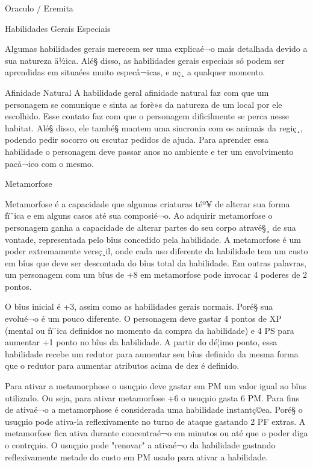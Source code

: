 


		 
	
	
  
  




 
 Oraculo / Eremita 
 	





Habilidades Gerais Especiais

Algumas habilidades gerais merecem ser uma explicaé¬o mais detalhada devido a sua natureza ä½ica. Alé§ disso, as habilidades gerais especiais só podem ser aprendidas em situaées muito especå¬icas, e nç¸ a qualquer momento.

Afinidade Natural
 A habilidade geral afinidade natural faz com que um personagem se comunique e sinta as forè»s da natureza de um local por ele escolhido. Esse contato faz com que o personagem dificilmente se perca nesse habitat. Alé§ disso, ele també§ mantem uma sincronia com os animais da regiç¸, podendo pedir socorro ou escutar pedidos de ajuda. Para aprender essa habilidade o personagem deve passar anos no ambiente e ter um envolvimento pacå¬ico com o mesmo.
 
 
 Metamorfose
 
 Metamorfose é a capacidade que algumas criaturas téº¥ de alterar sua forma fï¨ica e em alguns casos até sua composié¬o. Ao adquirir metamorfose o personagem ganha a capacidade de alterar partes do seu corpo atravé§¸ de sua vontade, representada pelo bîus concedido pela habilidade. A metamorfose é um poder extremamente versç¸il, onde cada uso diferente da habilidade tem um custo em bîus que deve ser descontada do bîus total da habilidade. Em outras palavras, um personagem com um bîus de +8 em metamorfose pode invocar 4 poderes de 2 pontos. 

O bîus inicial é +3, assim como as habilidades gerais normais. Poré§ sua evolué¬o é um pouco diferente. O personagem deve gastar 4 pontos de XP (mental ou fï¨ica definidos no momento da compra da habilidade) e 4 PS para aumentar +1 ponto no bîus da habilidade. A partir do dé¦imo ponto, essa habilidade recebe um redutor para aumentar seu bîus definido da mesma forma que o redutor para aumentar atributos acima de dez é definido.

Para ativar a metamorphose o usuçµio deve gastar em PM um valor igual ao bîus utilizado. Ou seja, para ativar metamorfose +6 o usuçµio gasta 6 PM. Para fins de ativaé¬o a metamorphose é considerada uma habilidade instantç©ea. Poré§ o usuçµio pode ativa-la reflexivamente no turno de ataque gastando 2 PF extras. A metamorfose fica ativa durante concentraé¬o em minutos ou até que o poder diga o contrçµio. O usuçµio pode "renovar" a ativaé¬o da habilidade gastando reflexivamente metade do custo em PM usado para ativar a habilidade. 

